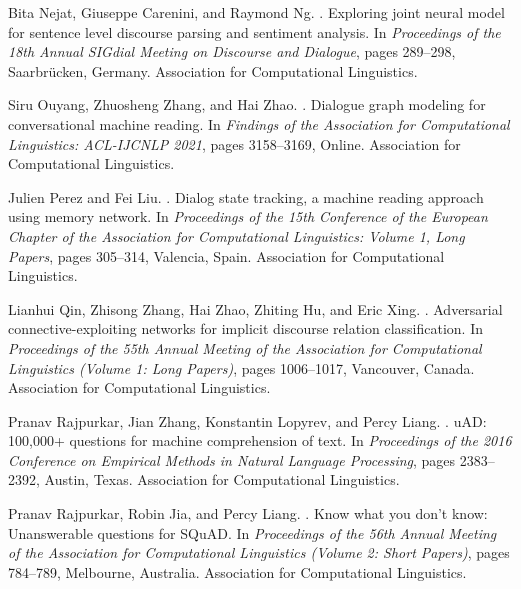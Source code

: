 \documentclass[11pt]{article}
\begin{document}
\begin{thebibliography}{}
Bita Nejat, Giuseppe Carenini, and Raymond Ng.
.
\newblock Exploring joint neural model for sentence level discourse parsing and
  sentiment analysis.
\newblock In {\em Proceedings of the 18th Annual {SIG}dial Meeting on Discourse
  and Dialogue}, pages 289--298, Saarbr{\"u}cken, Germany. Association for
  Computational Linguistics.

Siru Ouyang, Zhuosheng Zhang, and Hai Zhao.
.
\newblock Dialogue graph modeling for conversational machine reading.
\newblock In {\em Findings of the Association for Computational Linguistics:
  ACL-IJCNLP 2021}, pages 3158--3169, Online. Association for Computational
  Linguistics.

Julien Perez and Fei Liu.
.
\newblock Dialog state tracking, a machine reading approach using memory
  network.
\newblock In {\em Proceedings of the 15th Conference of the {E}uropean Chapter
  of the Association for Computational Linguistics: Volume 1, Long Papers},
  pages 305--314, Valencia, Spain. Association for Computational Linguistics.

Lianhui Qin, Zhisong Zhang, Hai Zhao, Zhiting Hu, and Eric Xing.
.
\newblock Adversarial connective-exploiting networks for implicit discourse
  relation classification.
\newblock In {\em Proceedings of the 55th Annual Meeting of the Association for
  Computational Linguistics (Volume 1: Long Papers)}, pages 1006--1017,
  Vancouver, Canada. Association for Computational Linguistics.

Pranav Rajpurkar, Jian Zhang, Konstantin Lopyrev, and Percy Liang.
.
u{AD}: 100,000+ questions for machine comprehension of text.
\newblock In {\em Proceedings of the 2016 Conference on Empirical Methods in
  Natural Language Processing}, pages 2383--2392, Austin, Texas. Association
  for Computational Linguistics.

Pranav Rajpurkar, Robin Jia, and Percy Liang.
.
\newblock Know what you don{'}t know: Unanswerable questions for {SQ}u{AD}.
\newblock In {\em Proceedings of the 56th Annual Meeting of the Association for
  Computational Linguistics (Volume 2: Short Papers)}, pages 784--789,
  Melbourne, Australia. Association for Computational Linguistics.


\end{thebibliography}
\end{document}
